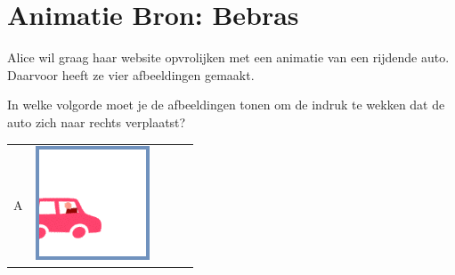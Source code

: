 \documentclass[12pt]{article}
\begin{document}
	\begin{minipage}{\textwidth}
		\section{Animatie \hfill\small Bron: Bebras}
		Alice wil graag haar website opvrolijken met een animatie van een rijdende auto. Daarvoor heeft ze vier afbeeldingen gemaakt.
		
		In welke volgorde moet je de afbeeldingen tonen om de indruk te wekken dat de auto zich naar rechts verplaatst? 
		
		\begin{table}[H]
			\begin{tabulary}{\linewidth}{|C|CCCC|}
				\hline 
				A &
				\vspace{0.01cm}\includegraphics[width=\linewidth]{option1} &

\end{tabulary}
\end{table}
\end{minipage}
\end{document}
